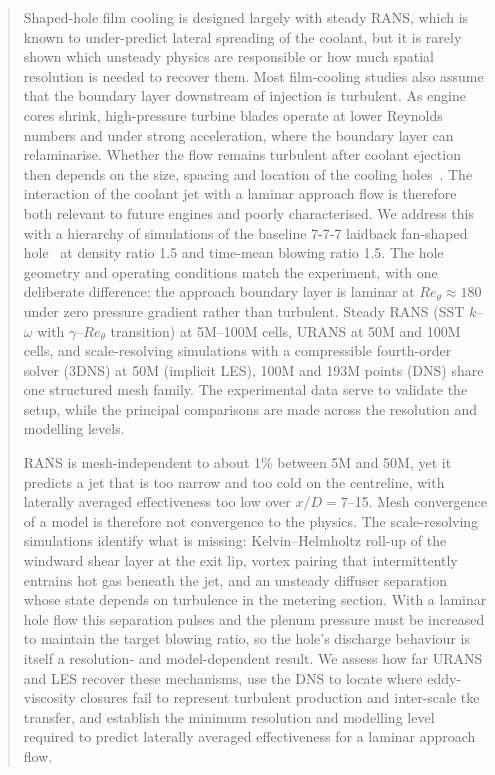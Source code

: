 \documentclass[colorlinks,upint,subscriptcorrection,varvw,hyphenate,balance,lineno]{asmeconf}
\newcommand*{\Reth}{\mathit{Re}_\theta}
\begin{document}
\begin{abstract}
Shaped-hole film cooling is designed largely with steady RANS, which is known to under-predict lateral spreading of the coolant, but it is rarely shown which unsteady physics are responsible or how much spatial resolution is needed to recover them. Most film-cooling studies also assume that the boundary layer downstream of injection is turbulent. As engine cores shrink, high-pressure turbine blades operate at lower Reynolds numbers and under strong acceleration, where the boundary layer can relaminarise. Whether the flow remains turbulent after coolant ejection then depends on the size, spacing and location of the cooling holes~\cite{kar2026}. The interaction of the coolant jet with a laminar approach flow is therefore both relevant to future engines and poorly characterised. We address this with a hierarchy of simulations of the baseline 7-7-7 laidback fan-shaped hole~\cite{schroeder2014} at density ratio 1.5 and time-mean blowing ratio 1.5. The hole geometry and operating conditions match the experiment, with one deliberate difference: the approach boundary layer is laminar at $\Reth \approx 180$ under zero pressure gradient rather than turbulent. Steady RANS (SST $k$--$\omega$ with $\gamma$--$\Reth$ transition) at 5M--100M cells, URANS at 50M and 100M cells, and scale-resolving simulations with a compressible fourth-order solver (3DNS) at 50M (implicit LES), 100M and 193M points (DNS) share one structured mesh family. The experimental data serve to validate the setup, while the principal comparisons are made across the resolution and modelling levels.

RANS is mesh-independent to about 1\% between 5M and 50M, yet it predicts a jet that is too narrow and too cold on the centreline, with laterally averaged effectiveness too low over $x/D = 7$--15. Mesh convergence of a model is therefore not convergence to the physics. The scale-resolving simulations identify what is missing: Kelvin--Helmholtz roll-up of the windward shear layer at the exit lip, vortex pairing that intermittently entrains hot gas beneath the jet, and an unsteady diffuser separation whose state depends on turbulence in the metering section. With a laminar hole flow this separation pulses and the plenum pressure must be increased to maintain the target blowing ratio, so the hole's discharge behaviour is itself a resolution- and model-dependent result. We assess how far URANS and LES recover these mechanisms, use the DNS to locate where eddy-viscosity closures fail to represent turbulent production and inter-scale tke transfer, and establish the minimum resolution and modelling level required to predict laterally averaged effectiveness for a laminar approach flow.
\end{abstract}
\end{document}

